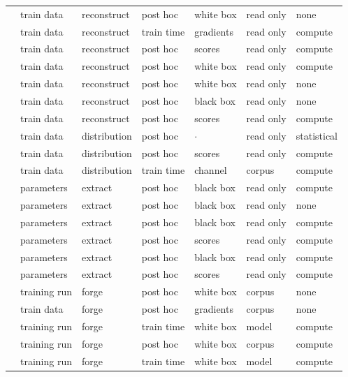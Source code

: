 \begin{landscape}
\begin{longtable}{rllllll}
\cite{KMNS26} & train data & reconstruct & post hoc & white box & read only & none \\
\cite{BDJV22} & train data & reconstruct & train time & gradients & read only & compute \\
\cite{HU14} & train data & reconstruct & post hoc & scores & read only & compute \\
\cite{ML24} & train data & reconstruct & post hoc & white box & read only & compute \\
\cite{BCH22} & train data & reconstruct & post hoc & white box & read only & none \\
\cite{WLBZ25} & train data & reconstruct & post hoc & black box & read only & none \\
\cite{HMST22} & train data & reconstruct & post hoc & scores & read only & compute \\
\cite{SE22} & train data & distribution & post hoc & $\cdot$ & read only & statistical \\
\cite{Son24} & train data & distribution & post hoc & scores & read only & compute \\
\cite{XSD24} & train data & distribution & train time & channel & corpus & compute \\
\cite{CCGJY20} & parameters & extract & post hoc & black box & read only & compute \\
\cite{SSEP24} & parameters & extract & post hoc & black box & read only & none \\
\cite{DKLP22} & parameters & extract & post hoc & black box & read only & compute \\
\cite{CJM20} & parameters & extract & post hoc & scores & read only & compute \\
\cite{JCBKP20} & parameters & extract & post hoc & black box & read only & compute \\
\cite{CCHRSS24} & parameters & extract & post hoc & scores & read only & compute \\
\cite{TJSP22} & training run & forge & post hoc & white box & corpus & none \\
\cite{KCC23} & train data & forge & post hoc & gradients & corpus & none \\
\cite{ZFWCSXZ26} & training run & forge & train time & white box & model & compute \\
\cite{FJTYCDCP23} & training run & forge & post hoc & white box & corpus & compute \\
\cite{DJYWWMNL26} & training run & forge & train time & white box & model & compute \\

\end{longtable}
\end{landscape}
